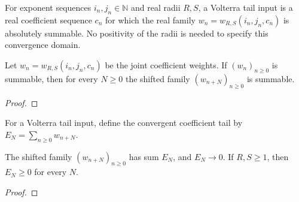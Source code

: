 \begin{supporting}
\begin{definition}
\label{def:volterra-tail-input}
\leanok
For exponent sequences $i_n,j_n\in\mathbb N$ and real radii $R,S$,
a Volterra tail input is a real coefficient sequence $c_n$ for which
the real family $w_n=w_{R,S}(i_n,j_n,c_n)$ is absolutely summable.
No positivity of the radii is needed to specify this convergence domain.
\end{definition}

\begin{theorem}
\label{thm:volterra-tail-input}
\leanok
Let $w_n=w_{R,S}(i_n,j_n,c_n)$ be the joint coefficient weights.
If $(w_n)_{n\ge0}$ is summable, then for every $N\ge0$ the shifted family
$(w_{n+N})_{n\ge0}$ is summable.
\end{theorem}
\begin{proof}
\leanok
\end{proof}

\begin{definition}
\label{def:volterra-series-tail}
\leanok
For a Volterra tail input, define the convergent coefficient tail by
$E_N=\sum_{n\ge0}w_{n+N}$.
\end{definition}

\begin{theorem}
\label{thm:volterra-series-tail}
\leanok
The shifted family $(w_{n+N})_{n\ge0}$ has sum $E_N$, and $E_N\to0$.
If $R,S\ge1$, then $E_N\ge0$ for every $N$.
\end{theorem}
\begin{proof}
\leanok
\end{proof}
\end{supporting}



